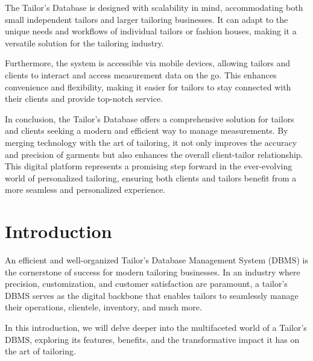 \documentclass[12pt, letter paper]{report}
\begin{document}
{\begin{spacing}{1.5}
The Tailor's Database is designed with scalability in mind, accommodating both small independent tailors and larger tailoring businesses. It can adapt to the unique needs and workflows of individual tailors or fashion houses, making it a versatile solution for the tailoring industry.

Furthermore, the system is accessible via mobile devices, allowing tailors and clients to interact and access measurement data on the go. This enhances convenience and flexibility, making it easier for tailors to stay connected with their clients and provide top-notch service.

In conclusion, the Tailor's Database offers a comprehensive solution for tailors and clients seeking a modern and efficient way to manage measurements. By merging technology with the art of tailoring, it not only improves the accuracy and precision of garments but also enhances the overall client-tailor relationship. This digital platform represents a promising step forward in the ever-evolving world of personalized tailoring, ensuring both clients and tailors benefit from a more seamless and personalized experience.
\end{spacing}



\renewcommand{\contentsname}{Table of Contents}
\tableofcontents
{}
\listoffigures
{}
\listoftables
{}
\newpage
\thispagestyle{empty}
\chapter{Introduction}
\begin{spacing}{1.5}
An efficient and well-organized Tailor's Database Management System (DBMS) is the cornerstone of success for modern tailoring businesses. In an industry where precision, customization, and customer satisfaction are paramount, a tailor's DBMS serves as the digital backbone that enables tailors to seamlessly manage their operations, clientele, inventory, and much more.

 In this introduction, we will delve deeper into the multifaceted world of a Tailor's DBMS, exploring its features, benefits, and the transformative impact it has on the art of tailoring.
\end{spacing}
}
\end{document}
